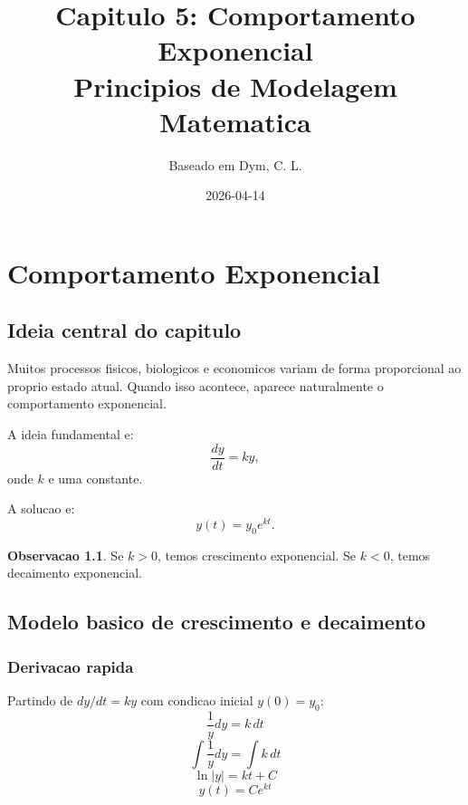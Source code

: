 \documentclass[12pt,a4paper,oneside]{book}
\title{\textbf{Capitulo 5: Comportamento Exponencial}\\[0.4cm]
\large Principios de Modelagem Matematica}
\author{Baseado em Dym, C. L.}
\date{2026-04-14}
\theoremstyle{definition}
\newtheorem{remark}[definition]{Observacao}
\begin{document}
\maketitle
\tableofcontents
\newpage

\chapter{Comportamento Exponencial}

\section{Ideia central do capitulo}

Muitos processos fisicos, biologicos e economicos variam de forma proporcional ao proprio estado atual.
Quando isso acontece, aparece naturalmente o comportamento exponencial.

A ideia fundamental e:
\begin{equation}
\frac{dy}{dt} = ky,
\end{equation}
onde $k$ e uma constante.

A solucao e:
\begin{equation}
y(t)=y_0e^{kt}.
\end{equation}

\begin{remark}
Se $k>0$, temos crescimento exponencial. Se $k<0$, temos decaimento exponencial.
\end{remark}

\section{Modelo basico de crescimento e decaimento}

\subsection{Derivacao rapida}

Partindo de $dy/dt=ky$ com condicao inicial $y(0)=y_0$:
\begin{equation}
\frac{1}{y}dy = k\,dt
\end{equation}
\begin{equation}
\int \frac{1}{y}dy = \int k\,dt
\end{equation}
\begin{equation}
\ln|y| = kt + C
\end{equation}
\begin{equation}
y(t)=Ce^{kt}
\end{equation}
\end{document}
